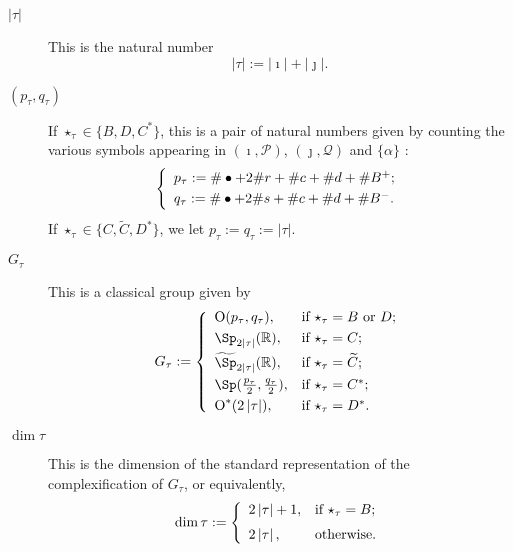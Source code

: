 \documentclass[12pt,a4paper]{amsart}
\def\abs#1{\left|{#1}\right|}
\newcommand{\CO}{{\mathcal {O}}}
\newcommand{\CP}{{\mathcal {P}}}
\newcommand{\CQ}{{\mathcal {Q}}}
\newcommand{\oO}{\operatorname{O}}
\newcommand{\R}{\mathbb R}
\numberwithin{equation}{section}
\theoremstyle{remark}
\begin{document}
\begin{description}
\item [$\abs{\tau}$] This is the natural number \[
  \abs{\tau}:=\abs{\imath}+\abs{\jmath}.
\]
\delete{Note that
\[
 \abs{\tau}= \left\{
     \begin{array}{ll}
        \frac{\abs{\check \CO}-1}{2}, &\hbox{if $\star_\tau=C$ or $C^*$}; \smallskip\\
          \frac{\abs{\check \CO}}{2}, &\hbox{otherwise}. \smallskip\\
                      \end{array}
   \right.
\]
}

\smallskip
\smallskip

\item [$(p_{\tau}, q_{\tau})$] If $\star_\tau\in \{B, D, C^*\}$, this is a pair of natural numbers given by counting the various symbols appearing in $(\imath, \CP)$, $(\jmath, \CQ)$ and $\{\alpha\}$ :
  \[
  \left\{
     \begin{array}{l}
    p_\tau := \# \bullet+ 2 \# r + \# c + \# d + \# B^+;\smallskip\\
    q_\tau := \# \bullet+ 2 \# s + \# c + \# d + \# B^-.\\
    \end{array}
    \right.
\]
If $\star_\tau\in \{C, \widetilde C, D^*\}$,  we let $p_\tau:=q_\tau:=\abs{\tau}$.

\smallskip
\smallskip

\item [$G_{\tau}$] This is a classical group given by
  \[
 G_\tau:= \left\{
     \begin{array}{ll}
         \oO(p_\tau, q_\tau), &\hbox{if $\star_\tau=B$ or $D$}; \smallskip\\
            \Sp_{2\abs{\tau}}(\R), &\hbox{if $\star_\tau=C$}; \smallskip\\
           \widetilde{\Sp}_{2\abs{\tau}}(\R), &\hbox{if $\star_\tau=\widetilde{ C}$}; \smallskip \\
        \Sp(\frac{p_\tau}{2}, \frac{q_\tau}{2}), &\hbox{if $\star_\tau=C^*$}; \smallskip \\
          \oO^*(2\abs{\tau}), &\hbox{if $\star_\tau=D^*$}.\\
            \end{array}
   \right.
\]

\smallskip
\smallskip

\item [$\dim \tau$]
This is the dimension of the standard representation of the complexification of $G_\tau$, or equivalently,
 \[
 \dim \tau:= \left\{
     \begin{array}{ll}
          2\abs{ \tau}+1, &\hbox{if $\star_\tau=B$}; \medskip\\
         2 \abs{\tau}, &\hbox{otherwise}.
            \end{array}
   \right.
 \]


\end{description}
\end{document}
